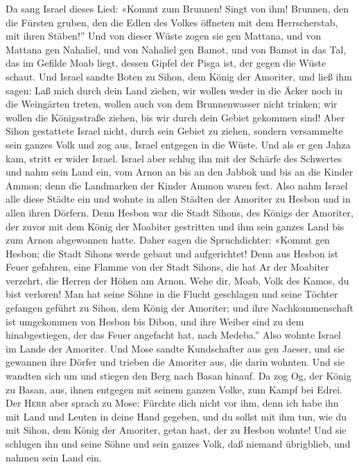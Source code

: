  Da sang Israel dieses Lied: «Kommt zum Brunnen! Singt
von ihm!  Brunnen, den die Fürsten gruben, den die Edlen
des Volkes öffneten mit dem Herrscherstab, mit ihren Stäben!'' Und von
dieser Wüste zogen sie gen Mattana,  und von Mattana gen
Nahaliel, und von Nahaliel gen Bamot, und von Bamot in das Tal,
 das im Gefilde Moab liegt, dessen Gipfel der Pisga ist,
der gegen die Wüste schaut.  Und Israel sandte Boten zu
Sihon, dem König der Amoriter, und ließ ihm sagen:  Laß
mich durch dein Land ziehen, wir wollen weder in die Äcker noch in die
Weingärten treten, wollen auch von dem Brunnenwasser nicht trinken; wir
wollen die Königsstraße ziehen, bis wir durch dein Gebiet gekommen sind!
 Aber Sihon gestattete Israel nicht, durch sein Gebiet zu
ziehen, sondern versammelte sein ganzes Volk und zog aus, Israel
entgegen in die Wüste. Und als er gen Jahza kam, stritt er wider Israel.
 Israel aber schlug ihn mit der Schärfe des Schwertes und
nahm sein Land ein, vom Arnon an bis an den Jabbok und bis an die Kinder
Ammon; denn die Landmarken der Kinder Ammon waren fest. 
Also nahm Israel alle diese Städte ein und wohnte in allen Städten der
Amoriter zu Hesbon und in allen ihren Dörfern.  Denn
Hesbon war die Stadt Sihons, des Königs der Amoriter, der zuvor mit dem
König der Moabiter gestritten und ihm sein ganzes Land bis zum Arnon
abgewonnen hatte.  Daher sagen die Spruchdichter: «Kommt
gen Hesbon; die Stadt Sihons werde gebaut und aufgerichtet!
 Denn aus Hesbon ist Feuer gefahren, eine Flamme von der
Stadt Sihons, die hat Ar der Moabiter verzehrt, die Herren der Höhen am
Arnon.  Wehe dir, Moab, Volk des Kamos, du bist verloren!
Man hat seine Söhne in die Flucht geschlagen und seine Töchter gefangen
geführt zu Sihon, dem König der Amoriter;  und ihre
Nachkommenschaft ist umgekommen von Hesbon bis Dibon, und ihre Weiber
sind zu dem hinabgestiegen, der das Feuer angefacht hat, nach Medeba.''
 Also wohnte Israel im Lande der Amoriter.
 Und Mose sandte Kundschafter aus gen Jaeser, und sie
gewannen ihre Dörfer und trieben die Amoriter aus, die darin wohnten.
 Und sie wandten sich um und stiegen den Berg nach Basan
hinauf. Da zog Og, der König zu Basan, aus, ihnen entgegen mit seinem
ganzen Volke, zum Kampf bei Edrei.  Der \textsc{Herr}
aber sprach zu Mose: Fürchte dich nicht vor ihm, denn ich habe ihn mit
Land und Leuten in deine Hand gegeben, und du sollst mit ihm tun, wie du
mit Sihon, dem König der Amoriter, getan hast, der zu Hesbon wohnte!
 Und sie schlugen ihn und seine Söhne und sein ganzes
Volk, daß niemand übrigblieb, und nahmen sein Land ein.

